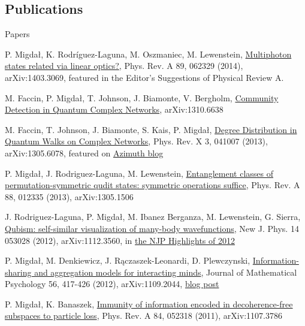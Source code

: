 \documentclass[margin,line]{resume}
\begin{document}
\begin{resume}
    \section{\mysidestyle Publications}
    Papers
    \begin{list2}
        \item P. Migdał, K. Rodríguez-Laguna, M. Oszmaniec, M. Lewenstein,
        \href{http://arxiv.org/abs/1403.3069}{Multiphoton states related via linear optics?}, Phys. Rev. A 89, 062329 (2014), arXiv:1403.3069,
        featured in the Editor's Suggestions of Physical Review A. 
        \item M. Faccin, P. Migdał, T. Johnson, J. Biamonte, V. Bergholm,
        \href{http://arxiv.org/abs/1310.6638}{Community Detection in Quantum Complex Networks}, arXiv:1310.6638
        \item M. Faccin, T. Johnson, J. Biamonte, S. Kais, P. Migdał,
        \href{http://arxiv.org/abs/1305.6078}{Degree Distribution in Quantum Walks on Complex Networks},
        Phys. Rev. X 3, 041007 (2013),
        arXiv:1305.6078,
        featured on \href{http://johncarlosbaez.wordpress.com/2013/08/05/quantum-network-theory-part-1/}{Azimuth blog}
        \item P. Migdał, J. Rodriguez-Laguna, M. Lewenstein,
        \href{http://arxiv.org/abs/1305.1506}{Entanglement classes of permutation-symmetric qudit states: symmetric operations suffice},
        Phys. Rev. A 88, 012335 (2013), arXiv:1305.1506
        \item J. Rodriguez-Laguna, P. Migdał, M. Ibanez Berganza, M. Lewenstein, G. Sierra, \href{http://dx.doi.org/10.1088/1367-2630/14/5/053028}{Qubism: self-similar visualization of many-body wavefunctions}, New J. Phys. 14 053028 (2012), arXiv:1112.3560,
        in \href{http://iopscience.iop.org/1367-2630/page/Highlights%20of%202012}{the NJP Highlights of 2012}
		\item P. Migdał, M. Denkiewicz, J. Rączaszek-Leonardi, D. Plewczynski, \href{http://arxiv.org/abs/1109.2044}{Information-sharing and aggregation models for interacting minds},
        Journal of Mathematical Psychology 56, 417-426 (2012),
        arXiv:1109.2044,
        \href{http://egtheory.wordpress.com/2014/01/30/two-heads-are-better-than-one-how-about-more/}{blog post}
        \item P. Migdał, K. Banaszek, \href{http://arxiv.org/abs/1107.3786}{Immunity of information encoded in decoherence-free subspaces to particle loss}, Phys. Rev. A 84, 052318 (2011), arXiv:1107.3786

\end{list2}
\end{resume}
\end{document}
